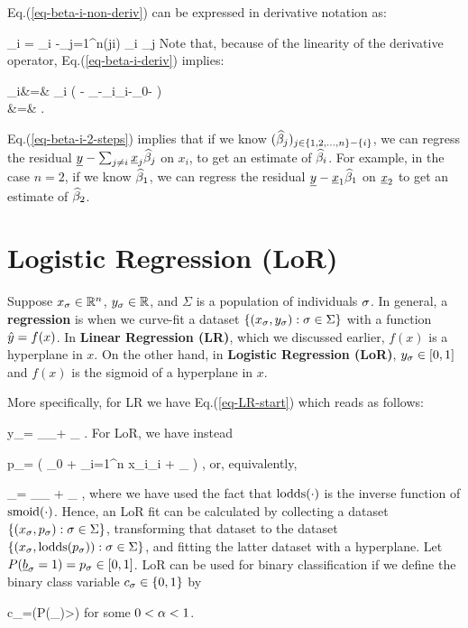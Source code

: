 Eq.(\ref{eq-beta-i-non-deriv})
can be expressed
in derivative notation as:

\beq
\beta_i
=
\pder{\rvy}
{\rvx_i}
-\sum_{j=1}^n\indi(j\neq i)
{\rvx_i}
\beta_j
\label{eq-beta-i-deriv}
\eeq
Note that,
because of the
linearity of the derivative operator,
Eq.(\ref{eq-beta-i-deriv})
implies:

\beqa
\beta_i&=&
\pder{}
{\rvx_i}
\left(\rvy
-
_{\rvy-\rvx_i\beta_i-\beta_0-\rveps}
\right)
\\
&=&
\rvy
\label{eq-beta-i-2-steps}
\;.
\eeqa

Eq.(\ref{eq-beta-i-2-steps})
implies that if 
we know $({\widehat{\beta}}_j)_{j\in \{1,2,
\ldots, n\}- \{ i\}}$,
we can regress
the residual
$\rvy
-\sum_{j\neq i} \rvx_j\HAT{\beta}_j$ on 
$x_i$, to get an
estimate of ${\widehat{\beta}}_i$.
For example, in the case $n=2$,
if we know ${\widehat{\beta}}_1$,
we can regress
the residual 
$\rvy-\rvx_1\HAT{\beta}_1$
on $\rvx_2$ to get an estimate
of ${\widehat{\beta}}_2$.



\section{Logistic Regression (LoR)}

Suppose
$x_\sigma\in { \mathbb{R}}^n$,
$y_\sigma\in { \mathbb{R}}$,
and $\Sigma$
is a population
of individuals $\sigma$.
In general,
a {\bf regression}
is when
we curve-fit a dataset
$\{(x_\sigma, y_\sigma):\sigma\in\Sigma\}$
with a function
${\hat{y}}=f(x)$.
In {\bf Linear
Regression (LR)},
which we
discussed earlier,
$f(x)$ is a hyperplane
in $x$.
On the other hand,
in {\bf Logistic Regression (LoR)},
$y_\sigma\in[0,1]$ and
$f(x)$ is the sigmoid of
a hyperplane in $x$.



More specifically, for LR
we have
Eq.(\ref{eq-LR-start})
which reads as follows:

\beq
y_\s=
_{\haty_\s}+ \eps_\s
\quad{}\;.
\eeq
For LoR, we have instead

\beq
p_\s=
\smoid\left(
\beta_0 +
\sum_{i=1}^{n} x_{\s i}\beta_{i} + \eps_\s
\right)
\quad{}\;,
\eeq
or, equivalently,


\beq
{}
_{\ln {}}=
_{\haty_\s} + \eps_\s
\quad{}\;,
\eeq
where we have used the fact that
${\rm lodds}(\cdot)$
is the inverse function of ${\rm smoid}(\cdot)$.
Hence, an LoR
fit can be calculated by
collecting a dataset
$\{(x_\sigma, p_\sigma):\sigma\in\Sigma\}$,
transforming that
dataset to the dataset
$\{(x_\sigma,{\rm lodds}( p_\sigma)):\sigma\in\Sigma\}$,
and fitting the latter dataset
with a hyperplane.
Let $P(\rvb_\s=1)=p_\s\in [0,1]$.
LoR can be used
for binary
classification
if we define the
binary class
variable $c_\sigma\in \{0,1\}$ by

\beq
c_\s =\indi(P(\rvb_)>\alp)
\eeq
for some $0<\alpha<1$.

